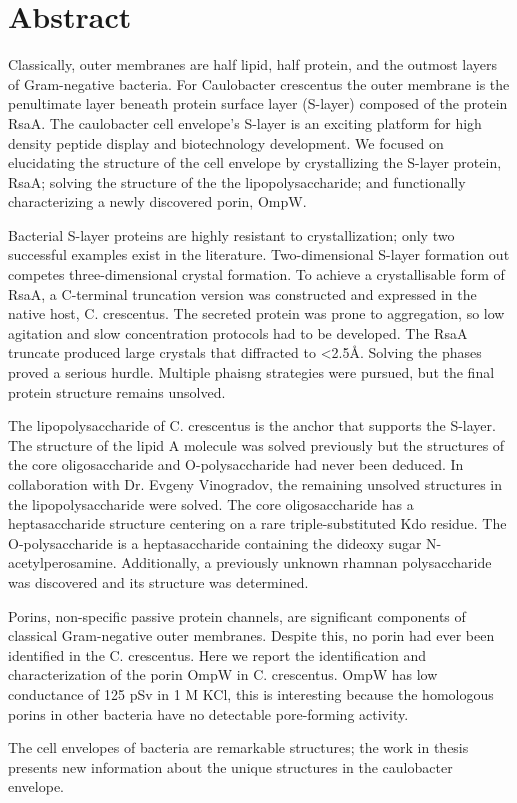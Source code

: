 
\chapter{Abstract}

Classically, outer membranes are half lipid, half protein, and the outmost layers of Gram-negative bacteria. For Caulobacter crescentus the outer membrane is the penultimate layer beneath protein surface layer (S-layer) composed of the protein RsaA. The caulobacter cell envelope’s S-layer is an exciting platform for high density peptide display and biotechnology development. We focused on elucidating the structure of the cell envelope by crystallizing the S-layer protein, RsaA; solving the structure of the the lipopolysaccharide; and functionally characterizing a newly discovered porin, OmpW. 

Bacterial S-layer proteins are highly resistant to crystallization; only two successful examples exist in the literature. Two-dimensional S-layer formation out competes three-dimensional crystal formation. To achieve a crystallisable form of RsaA, a C-terminal truncation version was constructed and expressed in the native host, C. crescentus. The secreted protein was prone to aggregation, so low agitation and slow concentration protocols had to be developed. The RsaA truncate produced large crystals that diffracted to <2.5\AA. Solving the phases proved a serious hurdle. Multiple phaisng strategies were pursued, but the final protein structure remains unsolved.

The lipopolysaccharide of C. crescentus is the anchor that supports the S-layer. The structure of the lipid A molecule was solved previously but the structures of the core oligosaccharide and O-polysaccharide had never been deduced. In collaboration with Dr. Evgeny Vinogradov, the remaining unsolved structures in the lipopolysaccharide were solved. The core oligosaccharide has a heptasaccharide structure centering on a rare triple-substituted Kdo residue. The O-polysaccharide is a heptasaccharide containing the dideoxy sugar N-acetylperosamine. Additionally, a previously unknown rhamnan polysaccharide was discovered and its structure was determined. 

Porins, non-specific passive protein channels, are significant components of classical Gram-negative outer membranes. Despite this, no porin had ever been identified in the C. crescentus. Here we report the identification and characterization of the porin OmpW in C. crescentus.  OmpW has low conductance of 125 pSv in 1 M KCl, this is interesting because the homologous porins in other bacteria have no detectable pore-forming activity.

The cell envelopes of bacteria are remarkable structures; the work in thesis presents new information about the unique structures in the caulobacter envelope. 
